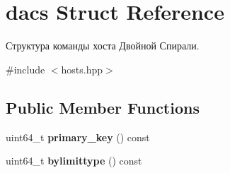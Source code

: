 \hypertarget{structdacs}{}\section{dacs Struct Reference}
\label{structdacs}


Структура команды хоста Двойной Спирали.  




{\ttfamily \#include $<$hosts.\+hpp$>$}

\subsection*{Public Member Functions}
\begin{DoxyCompactItemize}
\item 
\mbox{\label{structdacs_adbff85b09633fb360200e8571993d43f}} 
uint64\+\_\+t {\bfseries primary\+\_\+key} () const
\item 
\mbox{\label{structdacs_a3feeefb64e7c89474ba70e76277ebd28}} 
uint64\+\_\+t {\bfseries bylimittype} () const
\end{DoxyCompactItemize}
